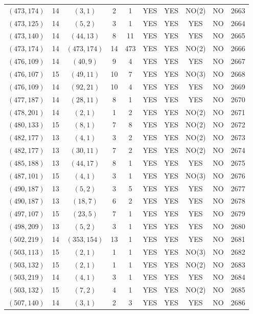 \begin{longtable}{|c|c|c|c|c|c|c|c|c|c|}
$(473, 174)$ & 14 & $(3, 1)$ & 2 & 1 & YES & YES & NO(2) & NO & 2663\\
$(473, 125)$ & 14 & $(5, 2)$ & 3 & 1 & YES & YES & YES & NO & 2664\\
$(473, 140)$ & 14 & $(44, 13)$ & 8 & 11 & YES & YES & YES & NO & 2665\\
$(473, 174)$ & 14 & $(473, 174)$ & 14 & 473 & YES & YES & NO(2) & NO & 2666\\
$(476, 109)$ & 14 & $(40, 9)$ & 9 & 4 & YES & YES & YES & NO & 2667\\
$(476, 107)$ & 15 & $(49, 11)$ & 10 & 7 & YES & YES & NO(3) & NO & 2668\\
$(476, 109)$ & 14 & $(92, 21)$ & 10 & 4 & YES & YES & YES & NO & 2669\\
$(477, 187)$ & 14 & $(28, 11)$ & 8 & 1 & YES & YES & YES & NO & 2670\\
$(478, 201)$ & 14 & $(2, 1)$ & 1 & 2 & YES & YES & NO(2) & NO & 2671\\
$(480, 133)$ & 15 & $(8, 1)$ & 7 & 8 & YES & YES & NO(2) & NO & 2672\\
$(482, 177)$ & 13 & $(4, 1)$ & 3 & 2 & YES & YES & NO(2) & NO & 2673\\
$(482, 177)$ & 13 & $(30, 11)$ & 7 & 2 & YES & YES & NO(2) & NO & 2674\\
$(485, 188)$ & 13 & $(44, 17)$ & 8 & 1 & YES & YES & YES & NO & 2675\\
$(487, 101)$ & 15 & $(4, 1)$ & 3 & 1 & YES & YES & NO(3) & NO & 2676\\
$(490, 187)$ & 13 & $(5, 2)$ & 3 & 5 & YES & YES & YES & NO & 2677\\
$(490, 187)$ & 13 & $(18, 7)$ & 6 & 2 & YES & YES & YES & NO & 2678\\
$(497, 107)$ & 15 & $(23, 5)$ & 7 & 1 & YES & YES & YES & NO & 2679\\
$(498, 209)$ & 13 & $(5, 2)$ & 3 & 1 & YES & YES & YES & NO & 2680\\
$(502, 219)$ & 14 & $(353, 154)$ & 13 & 1 & YES & YES & YES & NO & 2681\\
$(503, 113)$ & 15 & $(2, 1)$ & 1 & 1 & YES & YES & NO(3) & NO & 2682\\
$(503, 132)$ & 15 & $(2, 1)$ & 1 & 1 & YES & YES & NO(2) & NO & 2683\\
$(503, 219)$ & 14 & $(4, 1)$ & 3 & 1 & YES & YES & YES & NO & 2684\\
$(503, 132)$ & 15 & $(7, 2)$ & 4 & 1 & YES & YES & NO(2) & NO & 2685\\
$(507, 140)$ & 14 & $(3, 1)$ & 2 & 3 & YES & YES & YES & NO & 2686\\

\end{longtable}
